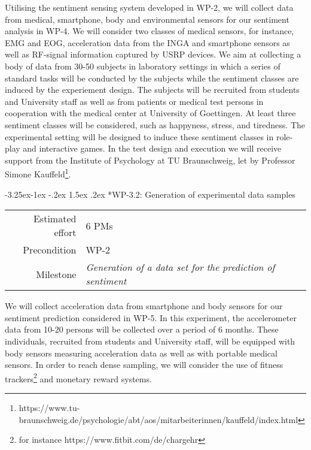 \documentclass[12pt]{article}
\makeatletter
\renewcommand\paragraph{\@startsection{paragraph}{4}{\z@}%
  {-3.25ex\@plus -1ex \@minus -.2ex}%
  {1.5ex \@plus .2ex}%
  {\normalfont\normalsize\bfseries}}
\makeatother
\begin{document}
\noindent
Utilising the sentiment sensing system developed in WP-2, we will collect data from medical, smartphone, body and environmental sensors for our sentiment analysis in WP-4. 
We will consider two classes of medical sensors, for instance, EMG and EOG, acceleration data from the INGA and smartphone sensors as well as RF-signal information captured by USRP devices. 
We aim at collecting a body of data from 30-50 subjects in laboratory settings in which a series of standard tasks will be conducted by the subjects while the sentiment classes are induced by the experiement design. 
The subjects will be recruited from students and University staff as well as from patients or medical test persons in cooperation with the medical center at University of Goettingen.
At least three sentiment classes will be considered, such as happyness, stress, and tiredness. 
The experimental setting will be designed to induce these sentiment classes in role-play and interactive games.
In the test design and execution we will receive support from the Institute of Psychology at TU Braunschweig, let by Professor Simone Kauffeld\footnote{https://www.tu-braunschweig.de/psychologie/abt/aos/mitarbeiterinnen/kauffeld/index.html}.

\paragraph*{WP-3.2: Generation of experimental data samples}
\begin{tabular}{rl}
 Estimated effort& 6 PMs\\
 Precondition & WP-2\\
 Milestone & \begin{minipage}[t]{12.2cm}
\textit{Generation of a data set for the prediction of sentiment}\vspace{.2cm}
             \end{minipage}
\end{tabular}

\noindent
We will collect acceleration data from smartphone and body sensors for our sentiment prediction considered in WP-5. 
In this experiment, the accelerometer data from 10-20 persons will be collected over a period of 6 months. 
These individuals, recruited from students and University staff, will be equipped with body sensors measuring acceleration data as well as with portable medical sensors. 
In order to reach dense sampling, we will consider the use of fitness trackers\footnote{for instance https://www.fitbit.com/de/chargehr} and monetary reward systems. 
\end{document}
